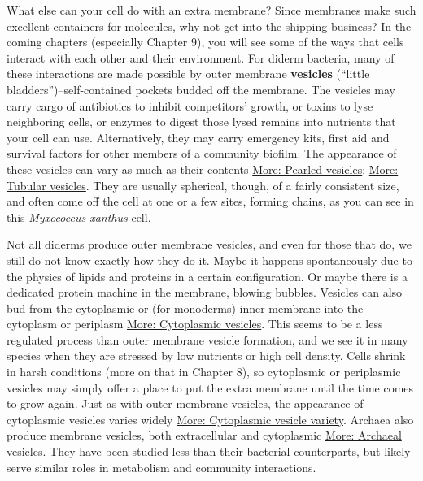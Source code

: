 \documentclass[]{tufte-book}
\begin{document}
What else can your cell do with an extra membrane? Since membranes make such excellent containers for molecules, why not get into the shipping business? In the coming chapters (especially Chapter 9), you will see some of the ways that cells interact with each other and their environment. For diderm bacteria, many of these interactions are made possible by outer membrane \textbf{vesicles} (``little bladders'')--self-contained pockets budded off the membrane. The vesicles may carry cargo of antibiotics to inhibit competitors' growth, or toxins to lyse neighboring cells, or enzymes to digest those lysed remains into nutrients that your cell can use. Alternatively, they may carry emergency kits, first aid and survival factors for other members of a community biofilm. The appearance of these vesicles can vary as much as their contents \protect\hyperlink{Pearled_vesicles}{More: Pearled vesicles}; \protect\hyperlink{Tubular_vesicles}{More: Tubular vesicles}. They are usually spherical, though, of a fairly consistent size, and often come off the cell at one or a few sites, forming chains, as you can see in this \emph{Myxococcus xanthus} cell.

Not all diderms produce outer membrane vesicles, and even for those that do, we still do not know exactly how they do it. Maybe it happens spontaneously due to the physics of lipids and proteins in a certain configuration. Or maybe there is a dedicated protein machine in the membrane, blowing bubbles. Vesicles can also bud from the cytoplasmic or (for monoderms) inner membrane into the cytoplasm or periplasm \protect\hyperlink{Cytoplasmic_vesicles}{More: Cytoplasmic vesicles}. This seems to be a less regulated process than outer membrane vesicle formation, and we see it in many species when they are stressed by low nutrients or high cell density. Cells shrink in harsh conditions (more on that in Chapter 8), so cytoplasmic or periplasmic vesicles may simply offer a place to put the extra membrane until the time comes to grow again. Just as with outer membrane vesicles, the appearance of cytoplasmic vesicles varies widely \protect\hyperlink{Cytoplasmic_vesicle_variety}{More: Cytoplasmic vesicle variety}. Archaea also produce membrane vesicles, both extracellular and cytoplasmic \protect\hyperlink{Archaeal_vesicles}{More: Archaeal vesicles}. They have been studied less than their bacterial counterparts, but likely serve similar roles in metabolism and community interactions.



\hypertarget{htmlwidget-c3395cea0400d3c4ff6c}{}
\end{document}
